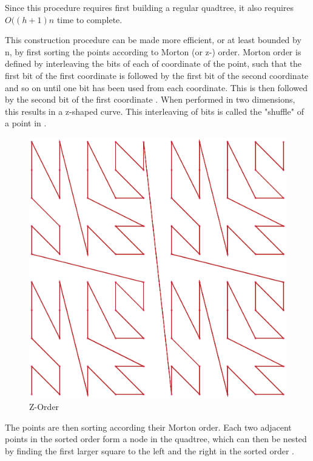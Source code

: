\documentclass[mcs]{scsthesis}
\begin{document}
Since this procedure requires first building a regular quadtree, it also
requires \(O((h + 1)n\) time to complete.

This construction procedure can be made more efficient, or at least bounded by
n, by first sorting the points according to Morton (or z-) order. Morton order
is defined by interleaving the bits of each of coordinate of the point, such
that the first bit of the first coordinate is followed by the first bit of the
second coordinate and so on until one bit has been used from each coordinate.
This is then followed by the second bit of the first coordinate \cite{morton}.
When performed in two dimensions, this results in a z-shaped curve. This
interleaving of bits is called the "shuffle" of a point in \cite{bern}.

\begin{figure}
\begin{center}
\includegraphics[scale=0.35]{diagrams/zorder.eps}
\caption{Z-Order}
\end{center}
\end{figure}

The points are then sorting according their Morton order. Each two adjacent
points in the sorted order form a node in the quadtree, which can then be
nested by finding the first larger square to the left and the right in the
sorted order \cite{bern}.
\end{document}
